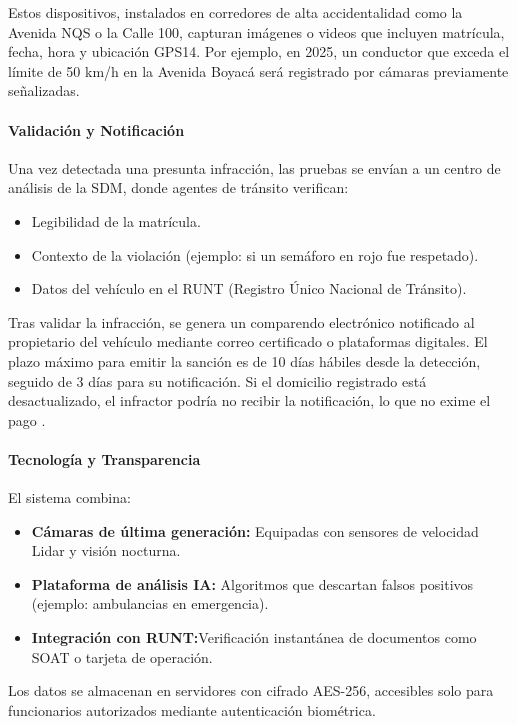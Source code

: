 Estos dispositivos, instalados en corredores de alta accidentalidad como la Avenida NQS o la Calle 100, capturan imágenes o videos que incluyen matrícula, fecha, hora y ubicación GPS14. Por ejemplo, en 2025, un conductor que exceda el límite de 50 km/h en la Avenida Boyacá será registrado por cámaras previamente señalizadas. 

\paragraph{Validación y Notificación }
Una vez detectada una presunta infracción, las pruebas se envían a un centro de análisis de la SDM, donde agentes de tránsito verifican:

\begin{itemize}
    \item Legibilidad de la matrícula. 
    \item Contexto de la violación (ejemplo: si un semáforo en rojo fue respetado).
    \item Datos del vehículo en el RUNT (Registro Único Nacional de Tránsito).
\end{itemize}

Tras validar la infracción, se genera un comparendo electrónico notificado al propietario del vehículo mediante correo certificado o plataformas digitales. El plazo máximo para emitir la sanción es de 10 días hábiles desde la detección, seguido de 3 días para su notificación. Si el domicilio registrado está desactualizado, el infractor podría no recibir la notificación, lo que no exime el pago \parencite{ley1843}. 

\paragraph{Tecnología y Transparencia }
El sistema combina: 
\begin{itemize}
    \item \textbf{Cámaras de última generación: }Equipadas con sensores de velocidad Lidar y visión nocturna. 
    \item \textbf{Plataforma de análisis IA: }Algoritmos que descartan falsos positivos (ejemplo: ambulancias en emergencia). 
        \item \textbf{Integración con RUNT:}Verificación instantánea de documentos como SOAT o tarjeta de operación.
\end{itemize}

Los datos se almacenan en servidores con cifrado AES-256, accesibles solo para funcionarios autorizados mediante autenticación biométrica.

